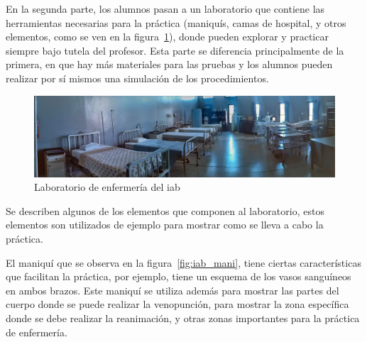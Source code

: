 En la segunda parte, los alumnos pasan a un laboratorio que contiene las
herramientas necesarias para la práctica (maniquís, camas de hospital, y otros
elementos, como se ven en la figura~\ref{fig:iab_lab}), donde pueden explorar y
practicar siempre bajo tutela del profesor. Esta parte se diferencia
principalmente de la primera, en que hay más materiales para las pruebas y los
alumnos pueden realizar por sí mismos una simulación de los procedimientos.

\begin{figure}[h!t] 
\centering 
\includegraphics[scale=0.3,natwidth=100,natheight=100]{problema/iab_sala_1.jpg}
\caption{Laboratorio de enfermería del \Gls{iab}}
\label{fig:iab_lab}
\end{figure}

Se describen algunos de los elementos que componen al laboratorio, estos
elementos son utilizados de ejemplo para mostrar como se lleva a cabo la
práctica.


El maniquí que se observa en la figura~\ref{fig:iab_mani}, tiene ciertas
características que facilitan la práctica, por ejemplo, tiene un esquema de los
vasos sanguíneos en ambos brazos. Este maniquí se utiliza además para mostrar
las partes del cuerpo donde se puede realizar la venopunción, para mostrar la
zona específica donde se debe realizar la reanimación, y otras zonas importantes
para la práctica de enfermería.

